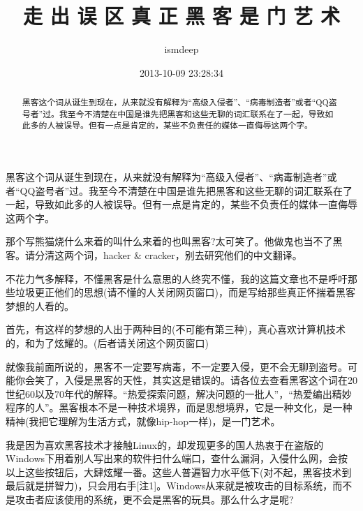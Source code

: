 \documentclass[12pt,a4paper]{article}
\begin{document}
\begin{CJK}{UTF8}{gbsn}
\title{走 出 误 区   真 正 黑 客 是 门 艺 术 }
\author{ismdeep}
\date{2013-10-09 23:28:34}


\maketitle


\begin{abstract}
黑客这个词从诞生到现在，从来就没有解释为“高级入侵者”、“病毒制造者”或者“QQ盗号者”过。我至今不清楚在中国是谁先把黑客和这些无聊的词汇联系在了一起，导致如此多的人被误导。但有一点是肯定的，某些不负责任的媒体一直侮辱这两个字。
\end{abstract}


黑客这个词从诞生到现在，从来就没有解释为“高级入侵者”、“病毒制造者”或者“QQ盗号者”过。我至今不清楚在中国是谁先把黑客和这些无聊的词汇联系在了一起，导致如此多的人被误导。但有一点是肯定的，某些不负责任的媒体一直侮辱这两个字。

那个写熊猫烧什么来着的叫什么来着的也叫黑客?太可笑了。他做鬼也当不了黑客。请分清这两个词，hacker \& cracker，别去研究他们的中文翻译。

不花力气多解释，不懂黑客是什么意思的人终究不懂，我的这篇文章也不是呼吁那些垃圾更正他们的思想(请不懂的人关闭网页窗口)，而是写给那些真正怀揣着黑客梦想的人看的。

首先，有这样的梦想的人出于两种目的(不可能有第三种)，真心喜欢计算机技术的，和为了炫耀的。(后者请关闭这个网页窗口)

就像我前面所说的，黑客不一定要写病毒，不一定要入侵，更不会无聊到盗号。可能你会笑了，入侵是黑客的天性，其实这是错误的。请各位去查看黑客这个词在20世纪60以及70年代的解释。“热爱探索问题，解决问题的一批人”，“热爱编出精妙程序的人”。黑客根本不是一种技术境界，而是思想境界，它是一种文化，是一种精神(我把它理解为生活方式，就像hip-hop一样)，是一门艺术。

我是因为喜欢黑客技术才接触Linux的，却发现更多的国人热衷于在盗版的Windows下用着别人写出来的软件扫什么端口，查什么漏洞，入侵什么网，会按以上这些按钮后，大肆炫耀一番。这些人普遍智力水平低下(对不起，黑客技术到最后就是拼智力)，只会用右手[注1]。Windows从来就是被攻击的目标系统，而不是攻击者应该使用的系统，更不会是黑客的玩具。那么什么才是呢?


\end{CJK}
\end{document}
